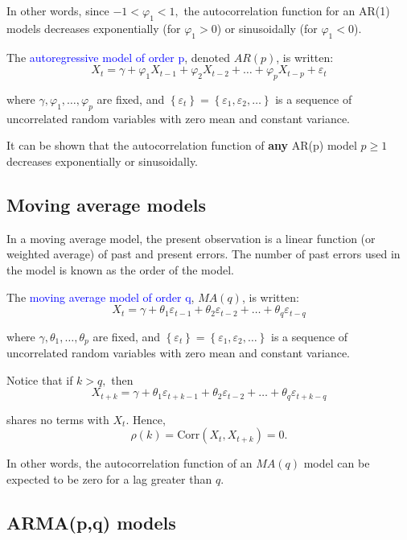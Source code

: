 \documentclass[12pt,a4paper,openany,twoside]{report}
\newcommand{\blue}{\textcolor{blue}}
\newcommand{\emphx}[1]{\blue{#1}}
\theoremstyle{definition}
\theoremstyle{remark}
\theoremstyle{plain}
\theoremstyle{definition}
\theoremstyle{definition}
\theoremstyle{definition}
\theoremstyle{remark}
\begin{document}
In other words, since \(- 1 < \varphi_{1} < 1,\) the autocorrelation
function for an AR(1) models decreases exponentially (for
\(\varphi_{1} > 0\)) or sinusoidally (for \(\varphi_{1} < 0\)).

The \emphx{autoregressive model of order p}, denoted \(AR(p)\), is
written:
\[X_{t} = \gamma + \varphi_{1}X_{t - 1} + \varphi_{2}X_{t - 2} + \ldots + \varphi_{p}X_{t - p} +
\varepsilon_{t}\]

where \(\gamma,\varphi_{1},\ldots,\varphi_{p}\) are fixed, and
\(\left\{ \varepsilon_{t} \right\} = \left\{ \varepsilon_{1},\varepsilon_{2},\ldots \right\}\)
is a sequence of uncorrelated random variables with zero mean and
constant variance.

It can be shown that the autocorrelation function of \textbf{any} AR(p)
model \(p \geq 1\) decreases exponentially or sinusoidally.

\hypertarget{mamodels}{%
\subsection{Moving average models}\label{mamodels}}

In a moving average model, the present observation is a linear function
(or weighted average) of past and present errors. The number of past
errors used in the model is known as the order of the model.

The \emphx{moving average model of order q}, \(MA(q)\), is written:
\[X_{t} = \gamma + \theta_{1}\varepsilon_{t - 1} + \theta_{2}\varepsilon_{t - 2} + 
\ldots + \theta_{q}\varepsilon_{t - q}\]

where \(\gamma,\theta_{1},\ldots,\theta_{p}\) are fixed, and
\(\left\{ \varepsilon_{t} \right\} = \left\{ \varepsilon_{1},\varepsilon_{2},\ldots \right\}\)
is a sequence of uncorrelated random variables with zero mean and
constant variance.

Notice that if \(k > q,\) then
\[X_{t + k} = \gamma + \theta_{1}\varepsilon_{t + k - 1} + \theta_{2}\varepsilon_{t - 2} + \ldots + \theta_{q}\varepsilon_{t + k - q}\]

shares no terms with \(X_{t}\). Hence,
\[\rho\left( k \right) = \text{Corr} \left( X_{t},X_{t + k} \right) = 0.\]

In other words, the autocorrelation function of an \(MA(q)\) model can
be expected to be zero for a lag greater than \(q\).

\hypertarget{armamodels}{%
\subsection{ARMA(p,q) models}\label{armamodels}}
\end{document}
